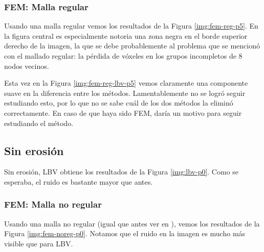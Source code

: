 \subsubsection{FEM: Malla regular}

Usando una malla regular vemos los resultados de la Figura \ref{img:fem-reg-p5}. En la figura central es especialmente notoria una zona negra en el borde superior derecho de la imagen, la que se debe probablemente al problema que se mencionó con el mallado regular: la pérdida de vóxeles en los grupos incompletos de 8 nodos vecinos.


Esta vez en la Figura \ref{img:fem-reg-lbv-p5} vemos claramente una componente suave en la diferencia entre los métodos. Lamentablemente no se logró seguir estudiando esto, por lo que no se sabe cuál de los dos métodos la eliminó correctamente. En caso de que haya sido FEM, daría un motivo para seguir estudiando el método.


\subsection{Sin erosión}

Sin erosión, LBV obtiene los resultados de la Figura \ref{img:lbv-p0}. Como se esperaba, el ruido es bastante mayor que antes.


\subsubsection{FEM: Malla no regular}

Usando una malla no regular (igual que antes ver  en ), vemos los resultados de la Figura \ref{img:fem-noreg-p0}. Notamos que el ruido en la imagen es mucho más visible que para LBV.


